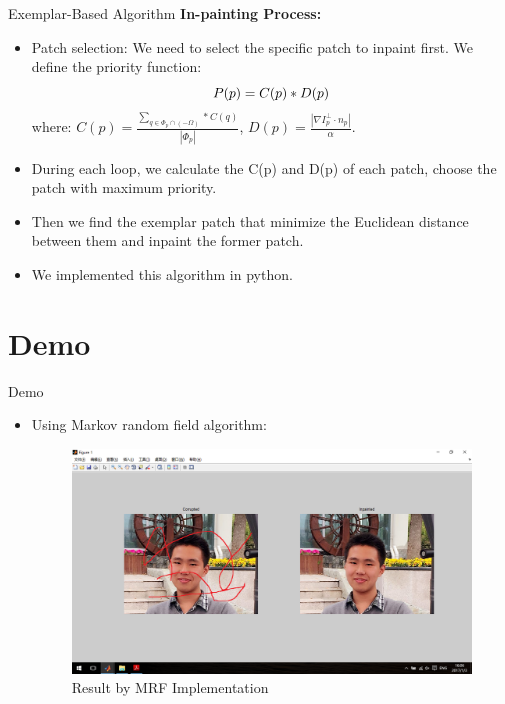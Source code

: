 \documentclass{beamer}
\begin{document}
\begin{frame}{Exemplar-Based Algorithm}
	\textbf{In-painting Process:}
	\begin{itemize}
		\item Patch selection: We need to select the specific patch to inpaint first. We define the priority function:
		\begin{equation*}
		\centering
		P(p)=C(p)*D(p)
		\nonumber
		\end{equation*}
		where: $C(p)=\frac{\sum_{q\in \Phi _p\cap(-\Omega)}*C(q)}{|\Phi_p|}$, $D(p)=\frac{|\nabla I^\bot_p \cdot n_p|}{\alpha}$.
		\item During each loop, we calculate the C(p) and D(p) of each patch, choose the patch with maximum priority.
		\item Then we find the exemplar patch that minimize the Euclidean distance between them and inpaint the former patch.
		\item We implemented this algorithm in python.
	\end{itemize}
\end{frame}


\section{Demo}
\begin{frame}{Demo}
	\begin{itemize}
		\item Using Markov random field algorithm:
		\begin{figure}
			\centering
			\includegraphics[width=1.0\linewidth]{rmf_result.png}
			\caption{Result by MRF Implementation}
		\end{figure}
	\end{itemize}
\end{frame}
\end{document}
